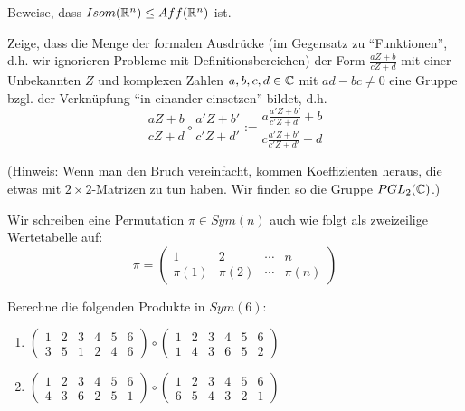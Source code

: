 \begin{sheet}
\begin{problem}[title={Automorphismen des affinen Raums}]
\begin{subproblem}
Beweise, dass $Isom(\mathbb{R}^n)\leq Aff(\mathbb{R}^n)$ ist.
\end{subproblem}
\end{problem}

\begin{problem}[title={Möbius-Transformationen / Automorphismen der projektiven Geraden}]
Zeige, dass die Menge der formalen Ausdrücke (im Gegensatz zu \enquote{Funktionen}, d.h. wir ignorieren Probleme mit Definitionsbereichen) der Form $\frac{aZ+b}{cZ+d}$ mit einer Unbekannten $Z$ und komplexen Zahlen $a,b,c,d\in\mathbb{C}$ mit $ad-bc\neq 0$ eine Gruppe bzgl. der Verknüpfung \enquote{in einander einsetzen} bildet, d.h.
\[\frac{aZ+b}{cZ+d} \circ \frac{a'Z+b'}{c'Z+d'} := \frac{a\frac{a'Z+b'}{c'Z+d'}+b}{c\frac{a'Z+b'}{c'Z+d'}+d}\]

(Hinweis: Wenn man den Bruch vereinfacht, kommen Koeffizienten heraus, die etwas mit $2\times 2$-Matrizen zu tun haben. Wir finden so die Gruppe $PGL_2(\mathbb{C})$.)
\end{problem}



\begin{problem}
Wir schreiben eine Permutation $\pi\in Sym(n)$ auch wie folgt als zweizeilige Wertetabelle auf:
\[\pi = \begin{pmatrix} 1& 2 & \cdots & n \\ \pi(1) & \pi(2) & \cdots & \pi(n)\end{pmatrix}\]

Berechne die folgenden Produkte in $Sym(6)$:
\begin{enumerate}
\item $\begin{pmatrix} 1 & 2 & 3 & 4 & 5 & 6 \\ 3 & 5 & 1 & 2 & 4 & 6\end{pmatrix} \circ \begin{pmatrix} 1 & 2 & 3 & 4 & 5 & 6 \\ 1 & 4 & 3 & 6 & 5 & 2\end{pmatrix}$
\item $\begin{pmatrix} 1 & 2 & 3 & 4 & 5 & 6 \\ 4 & 3 & 6 & 2 & 5 & 1\end{pmatrix} \circ \begin{pmatrix} 1 & 2 & 3 & 4 & 5 & 6 \\ 6 & 5 & 4 & 3 & 2 & 1\end{pmatrix}$
\end{enumerate}
\end{problem}


\end{sheet}
